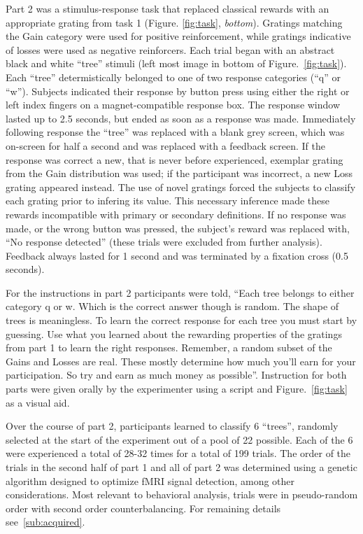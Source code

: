 \documentclass[doc,12pt]{apa}        %
\begin{document}
Part 2 was a stimulus-response task that replaced classical rewards with an appropriate grating from task 1 (Figure. \ref{fig:task}, \emph{bottom}).  Gratings matching the Gain category were used for positive reinforcement, while gratings indicative of losses were used as negative reinforcers.   Each trial began with an abstract black and white ``tree'' stimuli (left most image in bottom of Figure.~\ref{fig:task}).  Each ``tree'' determistically belonged to one of two response categories (``q'' or ``w'').  Subjects indicated their response by button press using either the right or left index fingers on a magnet-compatible response box.  The response window lasted up to 2.5 seconds, but ended as soon as a response was made.  Immediately following response the ``tree'' was replaced with a blank grey screen, which was on-screen for half a second and was replaced with a feedback screen.  If the response was correct a new, that is never before experienced, exemplar grating from the Gain distribution was used; if the participant was incorrect, a new Loss grating appeared instead.  The use of novel gratings forced the subjects to classify each grating prior to infering its value.  This necessary inference made these rewards incompatible with primary or secondary definitions.  If no response was made, or the wrong button was pressed, the subject's reward was replaced with, ``No response detected'' (these trials were excluded from further analysis).  Feedback always lasted for 1 second and was terminated by a fixation cross (0.5 seconds).  

For the instructions in part 2 participants were told, ``Each tree belongs to either category q or w.  Which is the correct answer though is random.  The shape of trees is meaningless.  To learn the correct response for each tree you must start by guessing.  Use what you learned about the rewarding properties of the gratings from part 1 to learn the right responses.  Remember, a random subset of the Gains and Losses are real.  These mostly determine how much you'll earn for your participation.  So try and earn as much money as possible''.  Instruction for both parts were given orally by the experimenter using a script and Figure.~\ref{fig:task} as a visual aid.

Over the course of part 2, participants learned to classify 6 ``trees'', randomly selected at the start of the experiment out of a pool of 22 possible.  Each of the 6 were experienced a total of 28-32 times for a total of 199 trials. The order of the trials in the second half of part 1 and all of part 2 was determined using a genetic algorithm designed to optimize fMRI signal detection, among other considerations.  Most relevant to behavioral analysis, trials were in pseudo-random order with second order counterbalancing.  For remaining details see~\ref{sub:acquired}.
\end{document}
